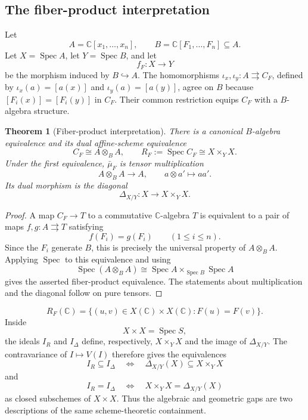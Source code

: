 \documentclass[11pt]{article}
\newtheorem{theorem}{Theorem}[section]
\theoremstyle{remark}
\theoremstyle{definition}
\DeclareMathOperator{\Spec}{Spec}
\newcommand{\C}{\mathbb C}
\begin{document}
\subsection{The fiber-product interpretation}
\label{sec:fiber-product}

Let
\[
  A=\C[x_1,\dots,x_n],\qquad
  B=\C[F_1,\dots,F_n]\subseteq A.
\]
Let \(X=\Spec A\), let \(Y=\Spec B\), and let
\[
  f_F\colon X\longrightarrow Y
\]
be the morphism induced by \(B\hookrightarrow A\).
The homomorphisms
\(\iota_x,\iota_y\colon A\rightrightarrows C_F\), defined by
\(\iota_x(a)=[a(x)]\) and \(\iota_y(a)=[a(y)]\), agree on \(B\) because
\([F_i(x)]=[F_i(y)]\) in \(C_F\).  Their common restriction equips
\(C_F\) with a \(B\)-algebra structure.

\begin{theorem}[Fiber-product interpretation]
\label{thm:collision-tensor-product}
There is a canonical \(B\)-algebra equivalence and its dual
affine-scheme equivalence
\[
  C_F\cong A\otimes_B A,
  \qquad
  R_F:=\Spec C_F\cong X\times_YX.
\]
Under the first equivalence, \(\bar\mu_F\) is tensor multiplication
\[
  A\otimes_BA\longrightarrow A,\qquad a\otimes a'\longmapsto aa'.
\]
Its dual morphism is the diagonal
\[
  \Delta_{X/Y}\colon X\longrightarrow X\times_YX.
\]
\end{theorem}

\begin{proof}
A map \(C_F\to T\) to a commutative \(\C\)-algebra \(T\) is equivalent
to a pair of maps \(f,g\colon A\rightrightarrows T\) satisfying
\[
  f(F_i)=g(F_i)\qquad(1\leq i\leq n).
\]
Since the \(F_i\) generate \(B\), this is precisely the universal
property of \(A\otimes_BA\).  Applying \(\Spec\) to this equivalence and
using
\[
  \Spec(A\otimes_BA)
  \cong
  \Spec A\times_{\Spec B}\Spec A
\]
gives the asserted fiber-product equivalence.
The statements about multiplication and the diagonal follow on pure
tensors.
\end{proof}

\[
  R_F(\C)
  =
  \{(u,v)\in X(\C)\times X(\C):F(u)=F(v)\}.
\]
Inside
\[
  X\times X=\Spec S,
\]
the ideals \(I_R\) and \(I_\Delta\) define, respectively,
\(X\times_YX\) and the image of \(\Delta_{X/Y}\).  The
contravariance of \(I\mapsto V(I)\) therefore gives the equivalences
\[
  I_R\subseteq I_\Delta
  \quad\Longleftrightarrow\quad
  \Delta_{X/Y}(X)\subseteq X\times_YX
\]
and
\[
  I_R=I_\Delta
  \quad\Longleftrightarrow\quad
  X\times_YX=\Delta_{X/Y}(X)
\]
as closed subschemes of \(X\times X\).  Thus the algebraic and
geometric gaps are two descriptions of the same scheme-theoretic
containment.
\end{document}
